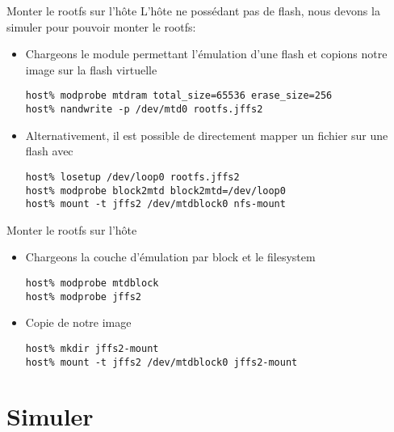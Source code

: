 \begin{frame}[fragile=singleslide]{Monter le rootfs sur l'hôte}
  L'hôte  ne possédant  pas  de  flash, nous  devons  la simuler  pour
  pouvoir monter le rootfs:
  \begin{itemize} 
  \item  Chargeons le  module  permettant l'émulation  d'une flash  et
    copions notre image sur la flash virtuelle
    \begin{lstlisting}
host% modprobe mtdram total_size=65536 erase_size=256
host% nandwrite -p /dev/mtd0 rootfs.jffs2
    \end{lstlisting}
  \item  Alternativement, il  est  possible de  directement mapper  un
    fichier sur une flash avec 
    \begin{lstlisting}
host% losetup /dev/loop0 rootfs.jffs2
host% modprobe block2mtd block2mtd=/dev/loop0
host% mount -t jffs2 /dev/mtdblock0 nfs-mount
    \end{lstlisting} 
  \end{itemize}
\end{frame}

\begin{frame}[fragile=singleslide]{Monter le rootfs sur l'hôte}
  \begin{itemize} 
  \item Chargeons la couche d'émulation par block et le filesystem
    \begin{lstlisting}
host% modprobe mtdblock
host% modprobe jffs2
    \end{lstlisting}
  \item Copie de notre image
    \begin{lstlisting} 
host% mkdir jffs2-mount
host% mount -t jffs2 /dev/mtdblock0 jffs2-mount
    \end{lstlisting} 
  \end{itemize}
\end{frame}


\section{Simuler}

